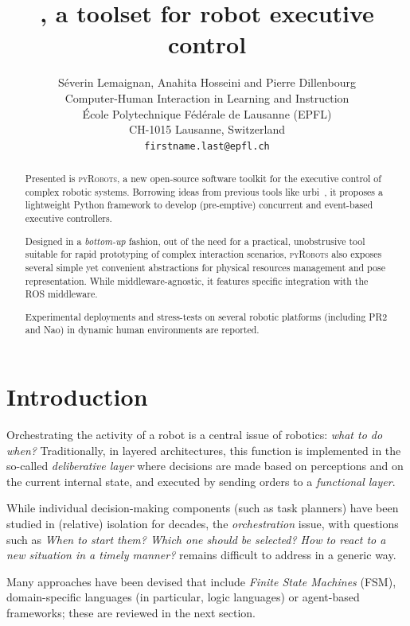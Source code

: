 \documentclass[letterpaper, 10pt, conference]{ieeeconf}      %
\title{\LARGE \bf
    \pyRobots{}, a toolset for robot executive control
}
\author{Séverin Lemaignan, Anahita Hosseini and Pierre Dillenbourg\\
Computer-Human Interaction in Learning and Instruction \\
École Polytechnique Fédérale de Lausanne (EPFL) \\
CH-1015 Lausanne, Switzerland \\
{\tt\small firstname.last@epfl.ch}
}
\newcommand{\pyRobots}{\textsc{pyRobots}}
\begin{document}
\maketitle
\thispagestyle{empty}
\pagestyle{empty}


\begin{abstract}

Presented is \pyRobots{}, a new open-source software toolkit for the executive
control of complex robotic systems. Borrowing ideas from previous tools like
{\sc urbi}~\cite{baillie2005urbi}, it proposes a lightweight Python framework to
develop (pre-emptive) concurrent and event-based executive controllers.

Designed in a \emph{bottom-up} fashion, out of the need for a practical,
unobstrusive tool suitable for rapid prototyping of complex interaction
scenarios, \pyRobots{} also exposes several simple yet convenient abstractions
for physical resources management and pose representation. While
middleware-agnostic, it features specific integration with the ROS middleware.

Experimental deployments and stress-tests on several robotic platforms
(including PR2 and Nao) in dynamic human environments are reported.

\end{abstract}


\section{Introduction}

Orchestrating the activity of a robot is a central issue of robotics: \emph{what
to do when?} Traditionally, in layered architectures, this function is
implemented in the so-called \emph{deliberative layer} where decisions are made
based on perceptions and on the current internal state, and executed by sending
orders to a \emph{functional layer}.

While individual decision-making components (such as task planners) have been
studied in (relative) isolation for decades, the \emph{orchestration} issue,
with questions such as \textit{When to start them? Which one should be selected?
How to react to a new situation in a timely manner?} remains difficult to
address in a generic way.

Many approaches have been devised that
include \emph{Finite State Machines} (FSM), domain-specific languages (in
particular, logic languages) or agent-based frameworks; these are reviewed in
the next section.
\end{document}
